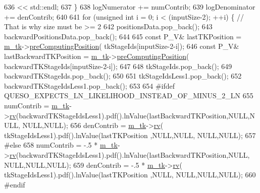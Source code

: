 \begin{DoxyCode}
636                            << std::endl;
637   \}
638   logNumerator   += numContrib;
639   logDenominator += denContrib;
640 
641   \textcolor{keywordflow}{for} (\textcolor{keywordtype}{unsigned} \textcolor{keywordtype}{int} i = 0; i < (inputSize-2); ++i) \{ \textcolor{comment}{// That is why size must be >= 2}
642             positionsData.pop\_back();
643     backwardPositionsData.pop\_back();
644 
645     \textcolor{keyword}{const} P\_V& lastTKPosition         = \hyperlink{class_q_u_e_s_o_1_1_metropolis_hastings_s_g_a26e9680abddfb793486c995fa16f8c2d}{m\_tk}->\hyperlink{class_q_u_e_s_o_1_1_base_t_k_group_aa864c6cc07327a698f91cef72cdc35aa}{preComputingPosition}(        
      tkStageIds[inputSize-2-i]);
646     \textcolor{keyword}{const} P\_V& lastBackwardTKPosition = \hyperlink{class_q_u_e_s_o_1_1_metropolis_hastings_s_g_a26e9680abddfb793486c995fa16f8c2d}{m\_tk}->\hyperlink{class_q_u_e_s_o_1_1_base_t_k_group_aa864c6cc07327a698f91cef72cdc35aa}{preComputingPosition}(
      backwardTKStageIds[inputSize-2-i]);
647 
648             tkStageIds.pop\_back();
649     backwardTKStageIds.pop\_back();
650 
651             tkStageIdsLess1.pop\_back();
652     backwardTKStageIdsLess1.pop\_back();
653 
654 \textcolor{preprocessor}{#ifdef QUESO\_EXPECTS\_LN\_LIKELIHOOD\_INSTEAD\_OF\_MINUS\_2\_LN}
655 \textcolor{preprocessor}{}    numContrib = \hyperlink{class_q_u_e_s_o_1_1_metropolis_hastings_s_g_a26e9680abddfb793486c995fa16f8c2d}{m\_tk}->\hyperlink{class_q_u_e_s_o_1_1_base_t_k_group_a6bd8e0bec0105471aad8801cbf1a0851}{rv}(backwardTKStageIdsLess1).pdf().lnValue(lastBackwardTKPosition,NULL,NULL,
      NULL,NULL);
656     denContrib = \hyperlink{class_q_u_e_s_o_1_1_metropolis_hastings_s_g_a26e9680abddfb793486c995fa16f8c2d}{m\_tk}->\hyperlink{class_q_u_e_s_o_1_1_base_t_k_group_a6bd8e0bec0105471aad8801cbf1a0851}{rv}(        tkStageIdsLess1).pdf().lnValue(lastTKPosition        ,NULL,NULL,
      NULL,NULL);
657 \textcolor{preprocessor}{#else}
658 \textcolor{preprocessor}{}    numContrib = -.5 * \hyperlink{class_q_u_e_s_o_1_1_metropolis_hastings_s_g_a26e9680abddfb793486c995fa16f8c2d}{m\_tk}->\hyperlink{class_q_u_e_s_o_1_1_base_t_k_group_a6bd8e0bec0105471aad8801cbf1a0851}{rv}(backwardTKStageIdsLess1).pdf().lnValue(lastBackwardTKPosition,NULL,
      NULL,NULL,NULL);
659     denContrib = -.5 * \hyperlink{class_q_u_e_s_o_1_1_metropolis_hastings_s_g_a26e9680abddfb793486c995fa16f8c2d}{m\_tk}->\hyperlink{class_q_u_e_s_o_1_1_base_t_k_group_a6bd8e0bec0105471aad8801cbf1a0851}{rv}(        tkStageIdsLess1).pdf().lnValue(lastTKPosition        ,NULL,
      NULL,NULL,NULL);
660 \textcolor{preprocessor}{#endif}

\end{DoxyCode}
